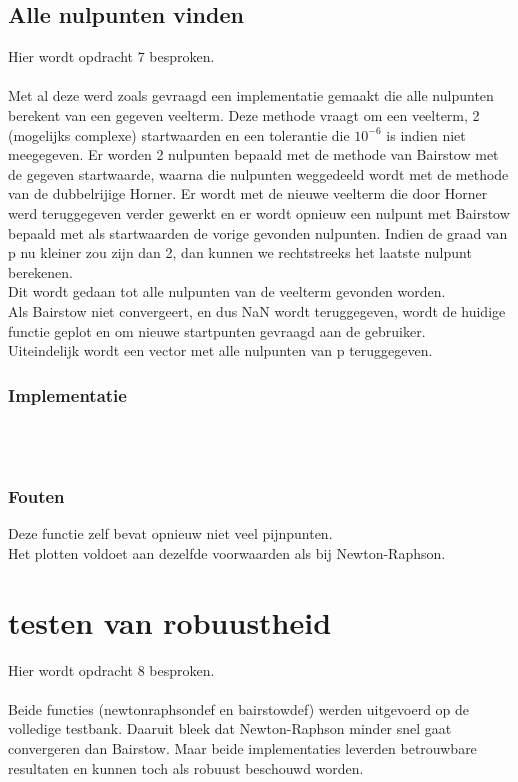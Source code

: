 \documentclass[a4paper,kulak]{kulakarticle}
\begin{document}
\subsection{Alle nulpunten vinden}
Hier wordt opdracht 7 besproken.
\\~\\
Met al deze werd zoals gevraagd een implementatie gemaakt die alle nulpunten berekent van een gegeven veelterm. Deze methode vraagt om een veelterm, 2 (mogelijks complexe) startwaarden en een tolerantie die $10^{-6}$ is indien niet meegegeven. Er worden 2 nulpunten bepaald met de methode van Bairstow met de gegeven startwaarde, waarna die nulpunten weggedeeld wordt met de methode van de dubbelrijige Horner. Er wordt met de nieuwe veelterm die door Horner werd teruggegeven verder gewerkt en er wordt opnieuw een nulpunt met Bairstow bepaald met als startwaarden de vorige gevonden nulpunten. Indien de graad van p nu kleiner zou zijn dan 2, dan kunnen we rechtstreeks het laatste nulpunt berekenen.
\\
Dit wordt gedaan tot alle nulpunten van de veelterm gevonden worden.
\\
Als Bairstow niet convergeert, en dus NaN wordt teruggegeven, wordt de huidige functie geplot en om  nieuwe startpunten gevraagd aan de gebruiker.\\
Uiteindelijk wordt een vector met alle nulpunten van p teruggegeven.

\subsubsection{Implementatie}

~\\~\\

\subsubsection{Fouten}
Deze functie zelf bevat opnieuw niet veel pijnpunten. 
\\
Het plotten voldoet aan dezelfde voorwaarden als bij Newton-Raphson.

\section{testen van robuustheid}
Hier wordt opdracht 8 besproken.
\\~\\
Beide functies (newtonraphsondef en bairstowdef) werden uitgevoerd op de volledige testbank. Daaruit bleek dat Newton-Raphson minder snel gaat convergeren dan Bairstow. Maar beide implementaties leverden betrouwbare resultaten en kunnen toch als robuust beschouwd worden.
\end{document}
